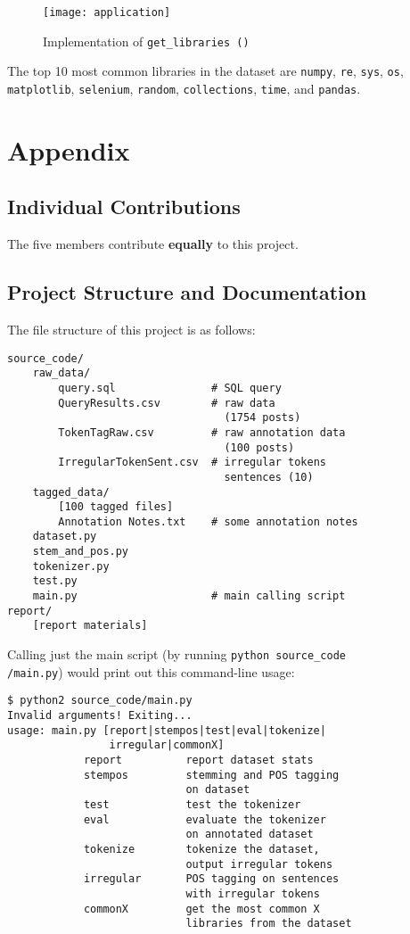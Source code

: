 \begin{figure}[htp]
\texttt{[image: application]}
\caption{Implementation of \texttt{get\_libraries\,()}}\label{img:app}
\end{figure}

The top 10 most common libraries in the dataset are \texttt{numpy}, \texttt{re},
\texttt{sys}, \texttt{os}, \texttt{matplotlib}, \texttt{selenium}, \texttt{random},
\texttt{collections}, \texttt{time}, and \texttt{pandas}.

\section*{Appendix}

\subsection*{Individual Contributions}

The five members contribute \textbf{equally} to this project.

\subsection*{Project Structure and Documentation}

The file structure of this project is as follows:

\begin{lstlisting}
source_code/
    raw_data/
        query.sql               # SQL query
        QueryResults.csv        # raw data
                                  (1754 posts)
        TokenTagRaw.csv         # raw annotation data
                                  (100 posts)
        IrregularTokenSent.csv  # irregular tokens
                                  sentences (10)
    tagged_data/
        [100 tagged files]
        Annotation Notes.txt    # some annotation notes
    dataset.py
    stem_and_pos.py
    tokenizer.py
    test.py
    main.py                     # main calling script
report/
    [report materials]
\end{lstlisting}

Calling just the main script (by running \texttt{python source\_code\\/main.py})
would print out this command-line usage:

\begin{lstlisting}
$ python2 source_code/main.py
Invalid arguments! Exiting...
usage: main.py [report|stempos|test|eval|tokenize|
                irregular|commonX]
            report          report dataset stats
            stempos         stemming and POS tagging
                            on dataset
            test            test the tokenizer
            eval            evaluate the tokenizer
                            on annotated dataset
            tokenize        tokenize the dataset,
                            output irregular tokens
            irregular       POS tagging on sentences
                            with irregular tokens
            commonX         get the most common X
                            libraries from the dataset
\end{lstlisting}

